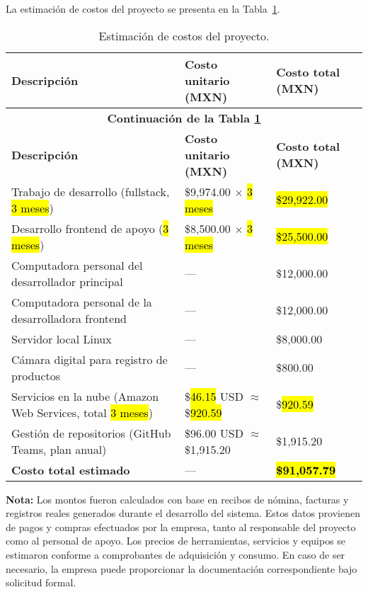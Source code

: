 La estimación de costos del proyecto se presenta en la Tabla~\ref{table:tablaCostos}.

\begin{longtable}{m{6.5cm} m{4.5cm} m{4cm}}
	\caption{Estimación de costos del proyecto.}
  	\label{table:tablaCostos}\\
  	\toprule
	\textbf{Descripción} & \textbf{Costo unitario (MXN)} & \textbf{Costo total (MXN)} \\
	\hline
	\endfirsthead

	\multicolumn{3}{c}{\textbf{Continuación de la Tabla \ref{table:tablaCostos}}}\\
	\hline
	\textbf{Descripción} & \textbf{Costo unitario (MXN)} & \textbf{Costo total (MXN)} \\
	\hline
	\endhead

	\hline
	\endlastfoot

Trabajo de desarrollo (fullstack, \hl{3 meses}) & \$9,974.00 $\times$ \hl{3 meses} & \hl{\$29,922.00} \\
\midrule

Desarrollo frontend de apoyo (\hl{3 meses}) & \$8,500.00 $\times$ \hl{3 meses} & \hl{\$25,500.00} \\
\midrule

Computadora personal del desarrollador principal & — & \$12,000.00 \\
\midrule

Computadora personal de la desarrolladora frontend & — & \$12,000.00 \\
\midrule

Servidor local Linux & — & \$8,000.00 \\
\midrule

Cámara digital para registro de productos & — & \$800.00 \\
\midrule

Servicios en la nube (Amazon Web Services, total \hl{3 meses}) & \$\hl{46.15} USD $\approx$ \$\hl{920.59} & \$\hl{920.59} \\
\midrule

Gestión de repositorios (GitHub Teams, plan anual) & \$96.00 USD $\approx$ \$1,915.20 & \$1,915.20 \\
\midrule

\textbf{Costo total estimado} & — & \textbf{\hl{\$91,057.79}} \\
\bottomrule
\end{longtable}

\vspace{0.5cm}

\noindent
\textbf{Nota:} Los montos fueron calculados con base en recibos de nómina, facturas y registros reales generados durante el desarrollo del sistema. Estos datos provienen de pagos y compras efectuados por la empresa, tanto al responsable del proyecto como al personal de apoyo. Los precios de herramientas, servicios y equipos se estimaron conforme a comprobantes de adquisición y consumo. En caso de ser necesario, la empresa puede proporcionar la documentación correspondiente bajo solicitud formal.

\vspace{1cm}